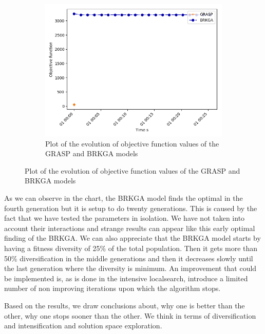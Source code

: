 \begin{figure}[h!]
\centering
\begin{subfigure}[b]{.8\linewidth}

\includegraphics[width=\linewidth]{./img/metah_comparison_objfunc.png}
\caption{ Plot of the evolution of objective function values of the GRASP and BRKGA models }\label{fig1a}
\end{subfigure}%
\label{meta_comparison}
\end{figure}



As we can observe in the chart, the BRKGA model finds the optimal in the fourth generation but it is setup to do twenty generations. This is caused by the fact that we have tested the parameters in isolation. We have not taken into account their interactions and strange results can appear like this early optimal finding of the BRKGA.
We can also appreciate that the BRKGA model starts by having a fitness diversity of 25\% of the total population. Then it gets more than 50\% diversification in the middle generations and then it decreases slowly until the last generation where the diversity is minimum.
An improvement that could be implemented is, as is done in the intensive localsearch, introduce a limited number of non improving iterations upon which the algorithm stops.




Based on the results, we draw conclusions about, why one is better than the other, why one stops sooner than the other. We think in terms of diversification and intensification and solution space exploration.\\

\pagebreak